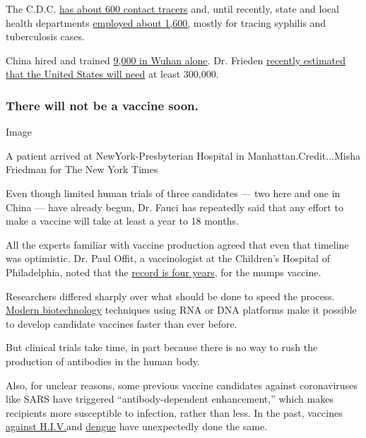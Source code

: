 The C.D.C.
\href{https://www.npr.org/sections/health-shots/2020/04/10/831200054/cdc-director-very-aggressive-contact-tracing-needed-for-u-s-to-return-to-normal}{has
about 600 contact tracers} and, until recently, state and local health
departments
\href{https://www.ncsddc.org/an-army-of-contact-tracers-will-bend-the-covid-19-curve/}{employed
about 1,600,} mostly for tracing syphilis and tuberculosis cases.

China hired and trained
\href{https://www.who.int/docs/default-source/coronaviruse/who-china-joint-mission-on-covid-19-final-report.pdf}{9,000
in Wuhan alone}. Dr. Frieden
\href{https://www.nytimes.com/2020/04/12/opinion/cdc-coronavirus.html}{recently
estimated that the United States will need} at least 300,000.

\hypertarget{there-will-not-be-a-vaccine-soon}{%
\subsubsection{There will not be a vaccine
soon.}\label{there-will-not-be-a-vaccine-soon}}

Image

A patient arrived at NewYork-Presbyterian Hospital in
Manhattan.Credit...Misha Friedman for The New York Times

Even though limited human trials of three candidates --- two here and
one in China --- have already begun, Dr. Fauci has repeatedly said that
any effort to make a vaccine will take at least a year to 18 months.

All the experts familiar with vaccine production agreed that even that
timeline was optimistic. Dr. Paul Offit, a vaccinologist at the
Children's Hospital of Philadelphia, noted that the
\href{https://www.cdc.gov/vaccines/pubs/pinkbook/mumps.html}{record is
four years}, for the mumps vaccine.

Researchers differed sharply over what should be done to speed the
process.
\href{https://www.nytimes.com/2020/04/08/health/coronavirus-vaccines.html}{Modern
biotechnology} techniques using RNA or DNA platforms make it possible to
develop candidate vaccines faster than ever before.

But clinical trials take time, in part because there is no way to rush
the production of antibodies in the human body.

Also, for unclear reasons, some previous vaccine candidates against
coronaviruses like SARS have triggered ``antibody-dependent
enhancement,'' which makes recipients more susceptible to infection,
rather than less. In the past, vaccines
\href{https://www.ncbi.nlm.nih.gov/pmc/articles/PMC3490694/}{against
H.I.V}\href{https://www.ncbi.nlm.nih.gov/pmc/articles/PMC5443089/}{.}and
\href{https://www.thelancet.com/journals/laninf/article/PIIS1473-3099(18)30023-9/fulltext}{dengue}
have unexpectedly done the same.

